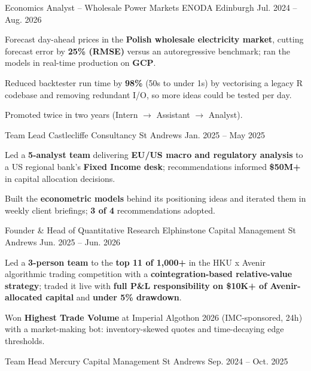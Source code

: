 \begin{cventries}
  \cventry
    {Economics Analyst -- Wholesale Power Markets}
    {ENODA}
    {Edinburgh}
    {Jul. 2024 -- Aug. 2026}
    {
      \begin{cvitems}
        \item {Forecast day-ahead prices in the \textbf{Polish wholesale electricity market}, cutting forecast error by \textbf{25\% (RMSE)} versus an autoregressive benchmark; ran the models in real-time production on \textbf{GCP}.}
        \item {Reduced backtester run time by \textbf{98\%} (50s to under 1s) by vectorising a legacy R codebase and removing redundant I/O, so more ideas could be tested per day.}
        \item {Promoted twice in two years (Intern $\to$ Assistant $\to$ Analyst).}
      \end{cvitems}
    }
  \cventry
    {Team Lead}
    {Castlecliffe Consultancy}
    {St Andrews}
    {Jan. 2025 -- May 2025}
    {
      \begin{cvitems}
        \item {Led a \textbf{5-analyst team} delivering \textbf{EU/US macro and regulatory analysis} to a US regional bank's \textbf{Fixed Income desk}; recommendations informed \textbf{\$50M+} in capital allocation decisions.}
        \item {Built the \textbf{econometric models} behind its positioning ideas and iterated them in weekly client briefings; \textbf{3 of 4} recommendations adopted.}
      \end{cvitems}
    }
  \cventry
    {Founder \& Head of Quantitative Research}
    {Elphinstone Capital Management}
    {St Andrews}
    {Jun. 2025 -- Jun. 2026}
    {
      \begin{cvitems}
        \item {Led a \textbf{3-person team} to the \textbf{top 11 of 1,000+} in the HKU x Avenir algorithmic trading competition with a \textbf{cointegration-based relative-value strategy}; traded it live with \textbf{full P\&L responsibility on \$10K+ of Avenir-allocated capital} and \textbf{under 5\% drawdown}.}
        \item {Won \textbf{Highest Trade Volume} at Imperial Algothon 2026 (IMC-sponsored, 24h) with a market-making bot: inventory-skewed quotes and time-decaying edge thresholds.}
      \end{cvitems}
    }
  \cventry
    {Team Head}
    {Mercury Capital Management}
    {St Andrews}
    {Sep. 2024 -- Oct. 2025}

\end{cventries}
